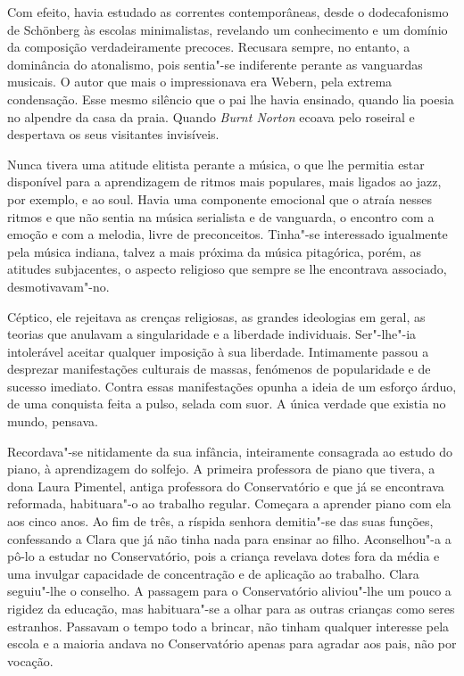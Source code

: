 Com efeito, havia estudado as correntes contemporâneas, desde o
dodecafonismo de Schönberg às escolas minimalistas, revelando um
conhecimento e um domínio da composição verdadeiramente precoces.
Recusara sempre, no entanto, a dominância do atonalismo, pois sentia"-se
indiferente perante as vanguardas musicais. O autor que mais o
impressionava era Webern, pela extrema condensação. Esse mesmo silêncio
que o pai lhe havia ensinado, quando lia poesia no alpendre da casa da
praia. Quando \emph{Burnt Norton }ecoava pelo roseiral e despertava os
seus visitantes invisíveis.

Nunca tivera uma atitude elitista perante a música, o que lhe permitia
estar disponível para a aprendizagem de ritmos mais populares, mais
ligados ao jazz, por exemplo, e ao soul. Havia uma componente emocional
que o atraía nesses ritmos e que não sentia na música serialista e de
vanguarda, o encontro com a emoção e com a melodia, livre de
preconceitos. Tinha"-se interessado igualmente pela música indiana,
talvez a mais próxima da música pitagórica, porém, as atitudes
subjacentes, o aspecto religioso que sempre se lhe encontrava associado,
desmotivavam"-no.

Céptico, ele rejeitava as crenças religiosas, as grandes ideologias em
geral, as teorias que anulavam a singularidade e a liberdade
individuais. Ser"-lhe"-ia intolerável aceitar qualquer imposição à sua
liberdade. Intimamente passou a desprezar manifestações culturais de
massas, fenómenos de popularidade e de sucesso imediato. Contra essas
manifestações opunha a ideia de um esforço árduo, de uma conquista feita
a pulso, selada com suor. A única verdade que existia no mundo, pensava.

Recordava"-se nitidamente da sua infância, inteiramente consagrada ao
estudo do piano, à aprendizagem do solfejo. A primeira professora de
piano que tivera, a dona Laura Pimentel, antiga professora do
Conservatório e que já se encontrava reformada, habituara"-o ao trabalho
regular. Começara a aprender piano com ela aos cinco anos. Ao fim de
três, a ríspida senhora demitia"-se das suas funções, confessando a Clara
que já não tinha nada para ensinar ao filho. Aconselhou"-a a pô-lo a
estudar no Conservatório, pois a criança revelava dotes fora da média e
uma invulgar capacidade de concentração e de aplicação ao trabalho.
Clara seguiu"-lhe o conselho. A passagem para o Conservatório aliviou"-lhe
um pouco a rigidez da educação, mas habituara"-se a olhar para as outras
crianças como seres estranhos. Passavam o tempo todo a brincar, não
tinham qualquer interesse pela escola e a maioria andava no
Conservatório apenas para agradar aos pais, não por vocação.

